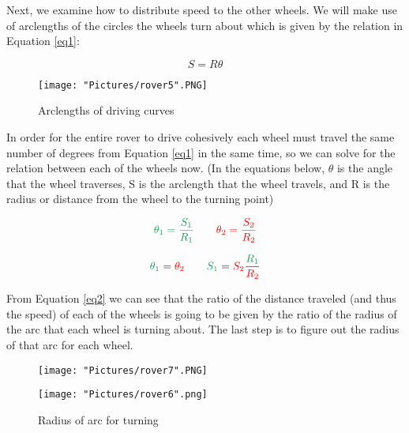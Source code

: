 \documentclass[12pt]{article}
\begin{document}
\noindent Next, we examine how to distribute speed to the other wheels. We will make use of arclengths of the circles the wheels turn about which is given by the relation in Equation \ref{eq1}:

\begin{equation}
	S = R  \theta
	\label{eq1}
\end{equation}

\begin{figure}[H]
 	\centering
	\texttt{[image: "Pictures/rover5".PNG]}
 	\caption{Arclengths of driving curves}
	\label{r3}
\end{figure}

\noindent In order for the entire rover to drive cohesively each wheel must travel the same number of degrees from Equation \ref{eq1} in the same time, so we can solve for the relation between each of the wheels now. (In the equations below, $\theta$ is the angle that the wheel traverses, S is the arclength that the wheel travels, and R is the radius or distance from the wheel to the turning point)

\begin{equation}
	\textcolor{ForestGreen}{\theta_1 = \frac{S_1}{R_1}} \qquad \textcolor{red}{\theta_2 = \frac{S_2}{R_2}}
\end{equation}

\begin{equation}
	\textcolor{ForestGreen}{\theta_1} = \textcolor{red}{\theta_2} \qquad \textcolor{ForestGreen}{S_1}=\textcolor{red}{S_2} \frac{\textcolor{ForestGreen}{R_1}}{\textcolor{red}{R_2}}
	\label{eq2}
\end{equation}

\noindent From Equation \ref{eq2} we can see that the ratio of the distance traveled (and thus the speed) of each of the wheels is going to be given by the ratio of the radius of the arc that each wheel is turning about. The last step is to figure out the radius of that arc for each wheel. 

\begin{figure}[H]
 	\centering
  	\begin{minipage}[b]{0.45\textwidth}
		\texttt{[image: "Pictures/rover7".PNG]}
  	\end{minipage}
  	\hfill
  	\begin{minipage}[b]{0.45\textwidth}
    		\texttt{[image: "Pictures/rover6".png]}
  	\end{minipage}
  	\caption{Radius of arc for turning}
	\label{r4}
\end{figure}
\end{document}
